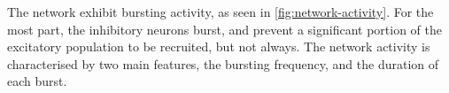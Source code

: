 

The network exhibit bursting activity, as seen in \cref{fig:network-activity}. For the most part,
the inhibitory neurons burst, and prevent a significant portion of the excitatory population to be
recruited, but not always. The network activity is characterised by two main features, the bursting
frequency, and the duration of each burst.

